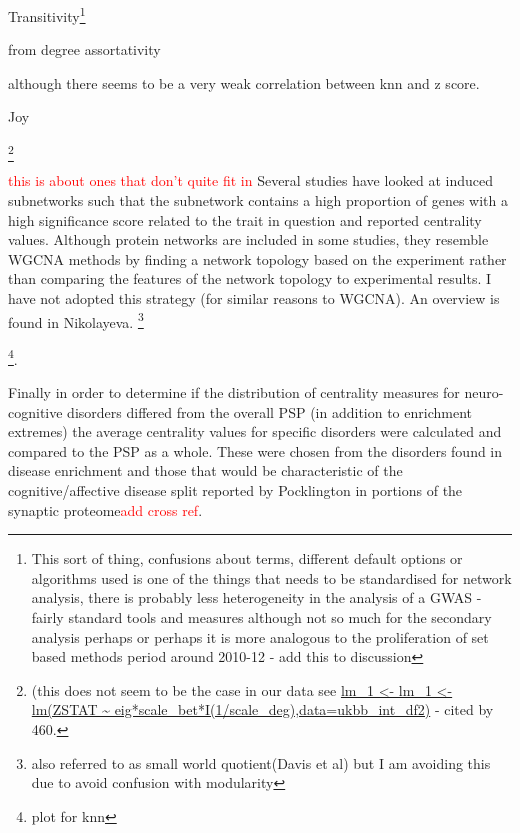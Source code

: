  
 
 Transitivity\footnote{This sort of thing, confusions about terms, different default options or algorithms used is one of the things that needs to be standardised for network analysis, there is probably less heterogeneity in the analysis of a GWAS - fairly standard tools and measures although not so much for the secondary analysis perhaps or perhaps it is more analogous to the proliferation of set based methods period around 2010-12 - add this to discussion}

from degree assortativity 

 although there seems to be a very weak correlation between knn and z score. 

Joy

\footnote{(this does not seem to be the case in our data see \url{lm_1 <- lm_1 <- lm(ZSTAT ~  eig*scale_bet*I(1/scale_deg),data=ukbb_int_df2)} - cited by 460.}
 
 
 
\textcolor{red}{this is about ones that don't quite fit in}
Several studies have looked at induced subnetworks such that the subnetwork contains a high proportion of genes with a high significance score related to the trait in question and reported centrality values. Although protein networks are included in some studies, they resemble WGCNA methods by finding a network topology based on the experiment rather than comparing the features of the network topology to experimental results. I have not adopted this strategy (for similar reasons to WGCNA). An overview is found in Nikolayeva\cite{nikolayeva2018network}.
  \footnote{also referred to as small world quotient(Davis et al) but I am avoiding this due to avoid confusion with modularity} 
  
  \footnote{plot for knn}.



Finally in order to determine if the distribution of centrality measures for neuro-cognitive disorders differed from the overall PSP (in addition to enrichment extremes) the average centrality values for specific disorders were calculated and compared to the PSP as a whole. These were chosen from the disorders found in disease enrichment and those that would be characteristic of the cognitive/affective disease split reported by Pocklington in portions of the synaptic proteome\cite{pocklington2006organization}\textcolor{red}{add cross ref}. 

